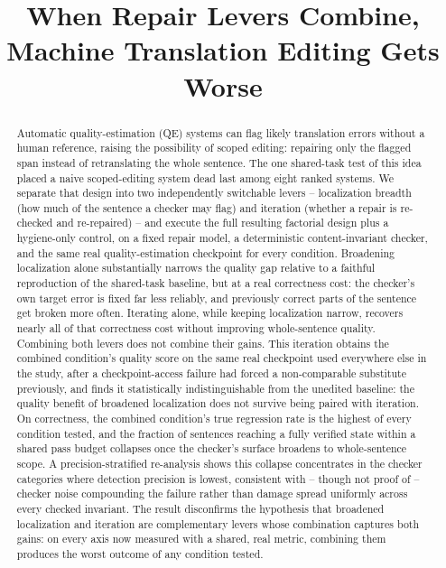 \documentclass[11pt,letterpaper]{article}
\title{When Repair Levers Combine, Machine Translation Editing Gets Worse}
\author{}
\date{}
\begin{document}
\maketitle

\begin{abstract}
Automatic quality-estimation (QE) systems can flag likely translation errors without a human reference, raising the possibility of scoped editing: repairing only the flagged span instead of retranslating the whole sentence. The one shared-task test of this idea placed a naive scoped-editing system dead last among eight ranked systems. We separate that design into two independently switchable levers -- localization breadth (how much of the sentence a checker may flag) and iteration (whether a repair is re-checked and re-repaired) -- and execute the full resulting factorial design plus a hygiene-only control, on a fixed repair model, a deterministic content-invariant checker, and the same real quality-estimation checkpoint for every condition. Broadening localization alone substantially narrows the quality gap relative to a faithful reproduction of the shared-task baseline, but at a real correctness cost: the checker's own target error is fixed far less reliably, and previously correct parts of the sentence get broken more often. Iterating alone, while keeping localization narrow, recovers nearly all of that correctness cost without improving whole-sentence quality. Combining both levers does not combine their gains. This iteration obtains the combined condition's quality score on the same real checkpoint used everywhere else in the study, after a checkpoint-access failure had forced a non-comparable substitute previously, and finds it statistically indistinguishable from the unedited baseline: the quality benefit of broadened localization does not survive being paired with iteration. On correctness, the combined condition's true regression rate is the highest of every condition tested, and the fraction of sentences reaching a fully verified state within a shared pass budget collapses once the checker's surface broadens to whole-sentence scope. A precision-stratified re-analysis shows this collapse concentrates in the checker categories where detection precision is lowest, consistent with -- though not proof of -- checker noise compounding the failure rather than damage spread uniformly across every checked invariant. The result disconfirms the hypothesis that broadened localization and iteration are complementary levers whose combination captures both gains: on every axis now measured with a shared, real metric, combining them produces the worst outcome of any condition tested.
\end{abstract}
\end{document}
